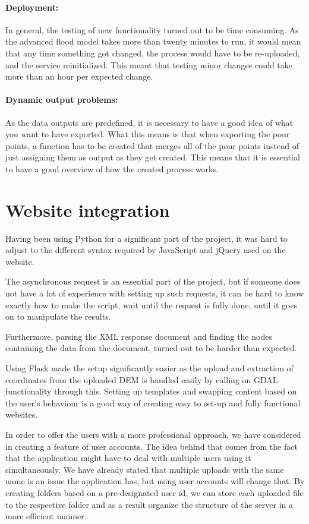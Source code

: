 \paragraph{Deployment:} In general, the testing of new functionality turned out to be time consuming. As the advanced flood model takes more than twenty minutes to run, it would mean that any time something got changed, the process would have to be re-uploaded, and the service reinitialized. This meant that testing minor changes could take more than an hour per expected change. 

\paragraph{Dynamic output problems:} As the data outputs are predefined, it is necessary to have a good idea of what you want to have exported. What this means is that when exporting the pour points, a function has to be created that merges all of the pour points instead of just assigning them as output as they get created. This means that it is essential to have a good overview of how the created process works. 

\section{Website integration} 
Having been using Python for a significant part of the project, it was hard to adjust to the different syntax required by JavaScript and jQuery used on the website.

The asynchronous request is an essential part of the project, but if someone does not have a lot of experience with setting up such requests, it can be hard to know exactly how to make the script, wait until the request is fully done, until it goes on to manipulate the results.

Furthermore, parsing the XML response document and finding the nodes containing the data from the document, turned out to be harder than expected.

Using Flask made the setup significantly easier as the upload and extraction of coordinates from the uploaded DEM is handled easily by calling on GDAL functionality through this. Setting up templates and swapping content based on the user's behaviour is a good way of creating easy to set-up and fully functional websites.

In order to offer the users with a more professional approach, we have considered in creating a feature of user accounts. The idea behind that comes from the fact that the application might have to deal with multiple users using it simultaneously. We have already stated that multiple uploads with the same name is an issue the application has, but using user accounts will change that. By creating folders based on a pre-designated user id, we can store each uploaded file to the respective folder and as a result organize the structure of the server in a more efficient manner.   

